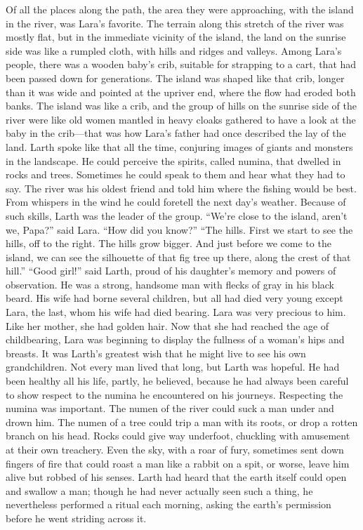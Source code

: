 Of all the places along the path, the area they were approaching, with the island in the river, was Lara’s favorite.
The terrain along this stretch of the river was mostly flat, but in the immediate vicinity of the island, the land on the sunrise side was like a rumpled cloth, with hills and ridges and valleys. Among Lara’s people, there was a wooden baby’s crib, suitable for strapping to a cart, that had been passed down for generations. The island was shaped like that crib, longer than it was wide and pointed at the upriver end, where the flow had eroded both banks. The island was like a crib, and the group of hills on the sunrise side of the river were like old women mantled in heavy cloaks gathered to have a look at the baby in the crib—that was how Lara’s father had once described the lay of the land.
Larth spoke like that all the time, conjuring images of giants and monsters in the landscape. He could perceive the spirits, called numina, that dwelled in rocks and trees. Sometimes he could speak to them and hear what they had to say. The river was his oldest friend and told him where the fishing would be best. From whispers in the wind he could foretell the next day’s weather. Because of such skills, Larth was the leader of the group.
“We’re close to the island, aren’t we, Papa?” said Lara.
“How did you know?”
“The hills. First we start to see the hills, off to the right. The hills grow bigger. And just before we come to the island, we can see the silhouette of that fig tree up there, along the crest of that hill.”
“Good girl!” said Larth, proud of his daughter’s memory and powers of observation. He was a strong, handsome man with flecks of gray in his black beard. His wife had borne several children, but all had died very young except Lara, the last, whom his wife had died bearing. Lara was very precious to him. Like her mother, she had golden hair. Now that she had reached the age of childbearing, Lara was beginning to display the fullness of a woman’s hips and breasts. It was Larth’s greatest wish that he might live to see his own grandchildren. Not every man lived that long, but Larth was hopeful. He had been healthy all his life, partly, he believed, because he had always been careful to show respect to the numina he encountered on his journeys.
Respecting the numina was important. The numen of the river could suck a man under and drown him. The numen of a tree could trip a man with its roots, or drop a rotten branch on his head. Rocks could give way underfoot, chuckling with amusement at their own treachery. Even the sky, with a roar of fury, sometimes sent down fingers of fire that could roast a man like a rabbit on a spit, or worse, leave him alive but robbed of his senses. Larth had heard that the earth itself could open and swallow a man; though he had never actually seen such a thing, he nevertheless performed a ritual each morning, asking the earth’s permission before he went striding across it.
